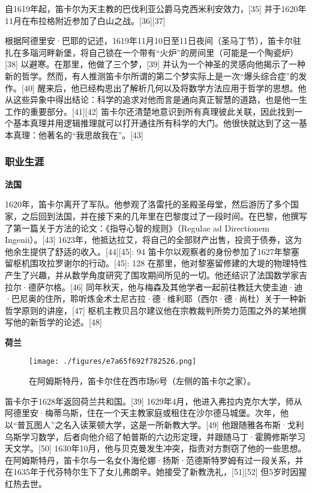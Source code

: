 自1619年起，笛卡尔为天主教的巴伐利亚公爵马克西米利安效力，[35] 并于1620年11月在布拉格附近参加了白山之战。[36][37]

根据阿德里安·巴耶的记述，1619年11月10日至11日夜间（圣马丁节），笛卡尔驻扎在多瑙河畔新堡，将自己锁在一个带有“火炉”的房间里（可能是一个陶瓷炉）[38] 以避寒。在那里，他做了三个梦，[39] 并认为一个神圣的灵感向他揭示了一种新的哲学。然而，有人推测笛卡尔所谓的第二个梦实际上是一次“爆头综合症”的发作。[40] 醒来后，他已经构思出了解析几何以及将数学方法应用于哲学的思想。他从这些异象中得出结论：科学的追求对他而言是通向真正智慧的道路，也是他一生工作的重要部分。[41][42] 笛卡尔还清楚地意识到所有真理彼此关联，因此找到一个基本真理并用逻辑推理就可以打开通往所有科学的大门。他很快就达到了这一基本真理：他著名的“我思故我在”。[43]
\subsubsection{职业生涯}

\textbf{法国}

1620年，笛卡尔离开了军队。他参观了洛雷托的圣殿圣母堂，然后游历了多个国家，之后回到法国，并在接下来的几年里在巴黎度过了一段时间。在巴黎，他撰写了第一篇关于方法的论文：《指导心智的规则》（Regulae ad Directionem Ingenii）。[43] 1623年，他抵达拉艾，将自己的全部财产出售，投资于债券，这为他余生提供了舒适的收入。[44][45]: 94 笛卡尔以观察者的身份参加了1627年黎塞留枢机围攻拉罗谢尔的行动。[45]: 128 在那里，他对黎塞留修建的大堤的物理特性产生了兴趣，并从数学角度研究了围攻期间所见的一切。他还结识了法国数学家吉拉尔·德萨尔格。[46] 同年秋天，他与梅森及其他学者一起前往教廷大使圭迪·迪·巴尼奥的住所，聆听炼金术士尼古拉·德·维利耶（西尔·德·尚杜）关于一种新哲学原则的讲座，[47] 枢机主教贝吕尔建议他在宗教裁判所势力范围之外的某地撰写他的新哲学的论述。[48]

\textbf{荷兰}
\begin{figure}[ht]
\centering
\texttt{[image: ./figures/e7a65f692f782526.png]}
\caption{在阿姆斯特丹，笛卡尔住在西市场6号（左侧的笛卡尔之家）。} \label{fig_DKE_4}
\end{figure}
笛卡尔于1628年返回荷兰共和国。[39] 1629年4月，他进入弗拉内克尔大学，师从阿德里安·梅蒂乌斯，住在一个天主教家庭或租住在沙尔德马城堡。次年，他以“普瓦图人”之名入读莱顿大学，这是一所新教大学。[49] 他跟随雅各布斯·戈利乌斯学习数学，后者向他介绍了帕普斯的六边形定理，并跟随马丁·霍腾修斯学习天文学。[50] 1630年10月，他与贝克曼发生冲突，指责对方剽窃了他的一些思想。在阿姆斯特丹，笛卡尔与一名女仆海伦娜·扬斯·范德斯特罗姆有过一段关系，并在1635年于代芬特尔生下了女儿弗朗辛。她接受了新教洗礼，[51][52] 但5岁时因猩红热去世。

